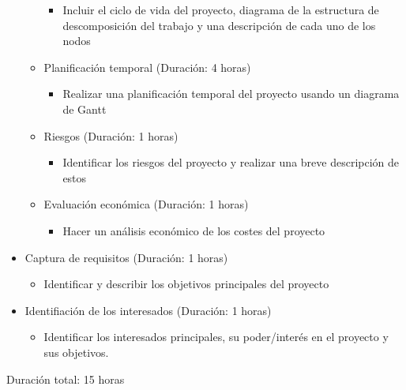 \documentclass{report}
\begin{document}
\begin{itemize}
\begin{itemize}
                        \begin{itemize}
                            \item Incluir el ciclo de vida del proyecto, diagrama de la estructura de descomposición del trabajo y una descripción de cada uno de los nodos
                        \end{itemize}
                        \item Planificación temporal (Duración: 4 horas)
                        \begin{itemize}
                            \item Realizar una planificación temporal del proyecto usando un diagrama de Gantt
                        \end{itemize}
                        \item Riesgos (Duración: 1 horas)
                        \begin{itemize}
                            \item Identificar los riesgos del proyecto y realizar una breve descripción de estos
                        \end{itemize}
                        \item Evaluación económica (Duración: 1 horas)
                        \begin{itemize}
                            \item Hacer un análisis económico de los costes del proyecto
                        \end{itemize}
                    \end{itemize}
                    \item Captura de requisitos (Duración: 1 horas)
                    \begin{itemize}
                        \item Identificar y describir los objetivos principales del proyecto
                    \end{itemize}
                    \item Identifiación de los interesados (Duración: 1 horas)
                    \begin{itemize}
                        \item Identificar los interesados principales, su poder/interés en el proyecto y sus objetivos.
                    \end{itemize}
                \end{itemize}
                Duración total: 15 horas
\end{document}
